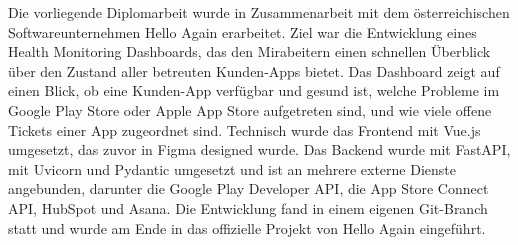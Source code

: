 
Die vorliegende Diplomarbeit wurde in Zusammenarbeit mit dem österreichischen Softwareunternehmen Hello Again erarbeitet.
Ziel war die Entwicklung eines Health Monitoring Dashboards, das den Mirabeitern einen schnellen Überblick über den Zustand aller betreuten Kunden-Apps bietet.
Das Dashboard zeigt auf einen Blick, ob eine Kunden-App verfügbar und gesund ist, welche Probleme im Google Play Store oder Apple App Store aufgetreten sind, und wie viele offene Tickets einer App zugeordnet sind.
Technisch wurde das Frontend mit Vue.js umgesetzt, das zuvor in Figma designed wurde.
Das Backend wurde mit FastAPI, mit Uvicorn und Pydantic umgesetzt und ist an mehrere externe Dienste angebunden, darunter die Google Play Developer API, die App Store Connect API, HubSpot und Asana.
Die Entwicklung fand in einem eigenen Git-Branch statt und wurde am Ende in das offizielle Projekt von Hello Again eingeführt.


